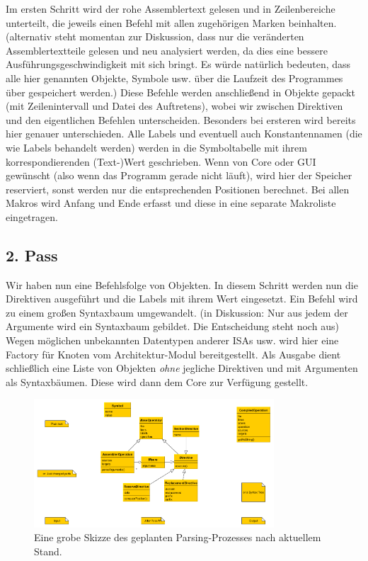 Im ersten Schritt wird der rohe Assemblertext gelesen und in Zeilenbereiche
unterteilt, die jeweils einen Befehl mit allen zugehörigen Marken beinhalten.
(alternativ steht momentan zur Diskussion, dass nur die veränderten
Assemblertextteile gelesen und neu analysiert werden, da dies eine bessere
Ausführungsgeschwindigkeit mit sich bringt.  Es würde natürlich bedeuten, dass
alle hier genannten Objekte, Symbole usw. über die Laufzeit des Programmes über
gespeichert werden.)  Diese Befehle werden anschließend in Objekte gepackt (mit
Zeilenintervall und Datei des Auftretens), wobei wir zwischen Direktiven und den
eigentlichen Befehlen unterscheiden.  Besonders bei ersteren wird bereits hier
genauer unterschieden.  Alle Labels und eventuell auch Konstantennamen (die wie
Labels behandelt werden) werden in die Symboltabelle mit ihrem
korrespondierenden (Text-)Wert geschrieben.  Wenn von Core oder GUI gewünscht
(also wenn das Programm gerade nicht läuft), wird hier der Speicher reserviert,
sonst werden nur die entsprechenden Positionen berechnet.  Bei allen Makros wird
Anfang und Ende erfasst und diese in eine separate Makroliste eingetragen.

\subsection{2. Pass}

Wir haben nun eine Befehlsfolge von Objekten. In diesem Schritt werden nun die
Direktiven ausgeführt und die Labels mit ihrem Wert eingesetzt.  Ein Befehl wird
zu einem großen Syntaxbaum umgewandelt. (in Diskussion: Nur aus jedem der
Argumente wird ein Syntaxbaum gebildet. Die Entscheidung steht noch aus) Wegen
möglichen unbekannten Datentypen anderer ISAs usw. wird hier eine Factory für
Knoten vom Architektur-Modul bereitgestellt.  Als Ausgabe dient schließlich eine
Liste von Objekten \emph{ohne} jegliche Direktiven und mit Argumenten als
Syntaxbäumen. Diese wird dann dem Core zur Verfügung gestellt.

\begin{figure}[h!]
  \centering
  \includegraphics[width=0.8\textwidth]{../parser/figures/process.png}
  \caption{Eine grobe Skizze des geplanten Parsing-Prozesses nach aktuellem Stand.}
\end{figure}

